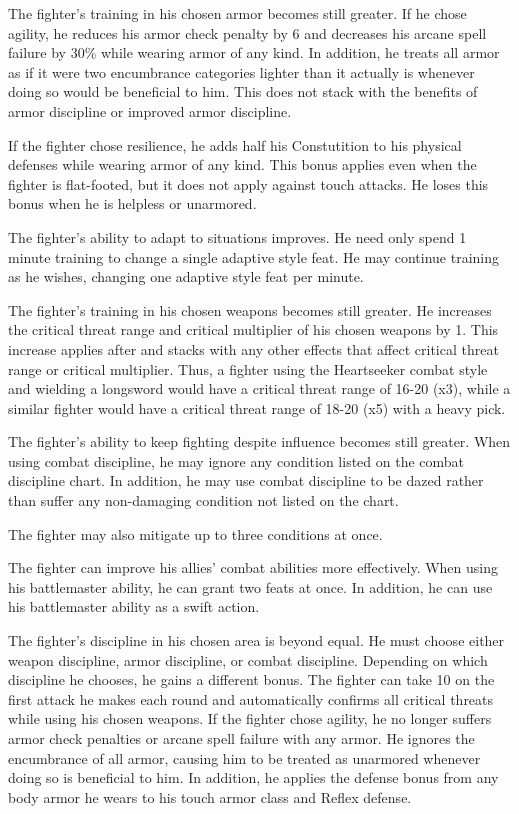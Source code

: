  The fighter's training in his chosen armor becomes still greater. If he chose agility, he reduces his armor check penalty by 6 and decreases his arcane spell failure by 30\% while wearing armor of any kind. In addition, he treats all armor as if it were two encumbrance categories lighter than it actually is whenever doing so would be beneficial to him. This does not stack with the benefits of armor discipline or improved armor discipline.

If the fighter chose resilience, he adds half his Constutition to his physical defenses while wearing armor of any kind. This bonus applies even when the fighter is flat-footed, but it does not apply against touch attacks. He loses this bonus when he is helpless or unarmored.

 The fighter's ability to adapt to situations improves. He need only spend 1 minute training to change a single adaptive style feat. He may continue training as he wishes, changing one adaptive style feat per minute.

 The fighter's training in his chosen weapons becomes still greater. He increases the critical threat range and critical multiplier of his chosen weapons by 1. This increase applies after and stacks with any other effects that affect critical threat range or critical multiplier. Thus, a fighter using the Heartseeker combat style and wielding a longsword would have a critical threat range of 16-20 (x3), while a similar fighter would have a critical threat range of 18-20 (x5) with a heavy pick.

 The fighter's ability to keep fighting despite influence becomes still greater. When using combat discipline, he may ignore any condition listed on the combat discipline chart. In addition, he may use combat discipline to be dazed rather than suffer any non-damaging condition not listed on the chart.

\par The fighter may also mitigate up to three conditions at once.

 The fighter can improve his allies' combat abilities more effectively. When using his battlemaster ability, he can grant two feats at once. In addition, he can use his battlemaster ability as a swift action.

 The fighter's discipline in his chosen area is beyond equal. He must choose either weapon discipline, armor discipline, or combat discipline. Depending on which discipline he chooses, he gains a different bonus.
 The fighter can take 10 on the first attack he makes each round and automatically confirms all critical threats while using his chosen weapons.
 If the fighter chose agility, he no longer suffers armor check penalties or arcane spell failure with any armor. He ignores the encumbrance of all armor, causing him to be treated as unarmored whenever doing so is beneficial to him. In addition, he applies the defense bonus from any body armor he wears to his touch armor class and Reflex defense.

